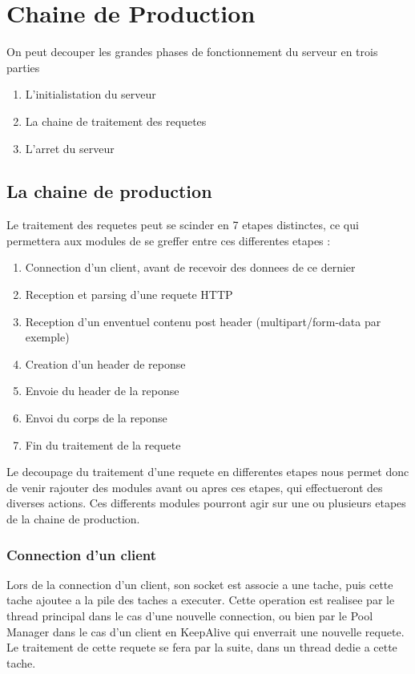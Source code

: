 \chapter{Chaine de Production}
On peut decouper les grandes phases de fonctionnement du serveur en trois parties

\begin{enumerate}
    \item L'initialistation du serveur
    \item La chaine de traitement des requetes
    \item L'arret du serveur
\end{enumerate}

\section{La chaine de production}
Le traitement des requetes peut se scinder en 7 etapes distinctes, 
ce qui permettera aux modules de se greffer entre ces differentes etapes :
\begin{enumerate}
    \item Connection d'un client, avant de recevoir des donnees de ce dernier
    \item Reception et parsing d'une requete HTTP
    \item Reception d'un enventuel contenu post header (multipart/form-data par exemple)
    \item Creation d'un header de reponse
    \item Envoie du header de la reponse
    \item Envoi du corps de la reponse
    \item Fin du traitement de la requete
\end{enumerate}

    \begin{figure}[h!]
    \end{figure}

\newpage

Le decoupage du traitement d'une requete en differentes etapes nous permet
donc de venir rajouter des modules avant ou apres ces etapes, qui 
effectueront des diverses actions. Ces differents modules pourront agir 
sur une ou plusieurs etapes de la chaine de production.

\subsection{Connection d'un client}
Lors de la connection d'un client, son socket est associe a une tache, puis cette tache ajoutee a la pile des taches a executer.
Cette operation est realisee par le thread principal dans le cas d'une nouvelle connection, ou bien par le Pool Manager dans le cas d'un client en KeepAlive qui enverrait une nouvelle requete.
Le traitement de cette requete se fera par la suite, dans un thread dedie a cette tache.


